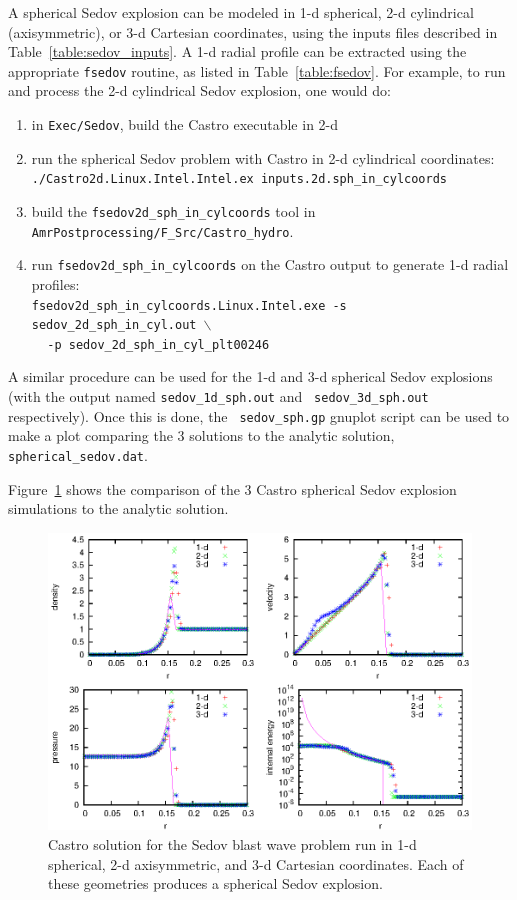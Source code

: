 A spherical Sedov explosion can be modeled in 1-d spherical, 2-d
cylindrical (axisymmetric), or 3-d Cartesian coordinates, using the
inputs files described in Table~\ref{table:sedov_inputs}.  A 1-d radial
profile can be extracted using the appropriate {\tt fsedov} routine,
as listed in Table~\ref{table:fsedov}.  For example, to run and process
the 2-d cylindrical Sedov explosion, one would do:
\begin{enumerate}
\item in {\tt Exec/Sedov}, build the Castro executable in 2-d
\item run the spherical Sedov problem with Castro in 2-d cylindrical coordinates: \\
 {\tt ./Castro2d.Linux.Intel.Intel.ex inputs.2d.sph\_in\_cylcoords} 
\item build the {\tt fsedov2d\_sph\_in\_cylcoords} tool in 
{\tt AmrPostprocessing/F_Src/Castro\_hydro}.  
\item run {\tt fsedov2d\_sph\_in\_cylcoords} on the Castro output to generate 1-d radial
 profiles: \\
 {\tt fsedov2d\_sph\_in\_cylcoords.Linux.Intel.exe -s sedov\_2d\_sph\_in\_cyl.out $\mathtt{\backslash}$ } \\
 $~~~~~${\tt -p sedov\_2d\_sph\_in\_cyl\_plt00246} 
\end{enumerate}
A similar procedure can be used for the 1-d and 3-d spherical Sedov
explosions (with the output named {\tt sedov\_1d\_sph.out} and {\tt
  sedov\_3d\_sph.out} respectively).  Once this is done, the {\tt
  sedov\_sph.gp} gnuplot script can be used to make a plot comparing
the 3 solutions to the analytic solution, {\tt spherical\_sedov.dat}.

Figure~\ref{fig:sedov_sph} shows the comparison of the 3 Castro
spherical Sedov explosion simulations to the analytic solution.

\begin{figure}[t]
\centering
\includegraphics[width=5.0in]{CastroVerification/sedov_sph}
\caption{\label{fig:sedov_sph} Castro solution for the Sedov blast wave problem
  run in 1-d spherical, 2-d axisymmetric, and 3-d Cartesian coordinates.
  Each of these geometries produces a spherical Sedov explosion.}
\end{figure}


